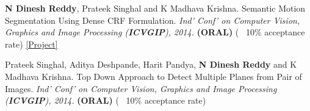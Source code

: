 \documentclass[7pt]{article}
\begin{document}
\begin{small}
\textbf{N Dinesh Reddy}, Prateek Singhal and K Madhava Krishna. Semantic Motion Segmentation Using Dense CRF Formulation. {\sl Ind' Conf' on Computer Vision, Graphics and Image Processing (\textbf{ICVGIP}), 2014.} \textbf{(ORAL)} (~ 10\% acceptance rate) \href{https://researchweb.iiit.ac.in/~dineshreddy.n/zerotype/projects/SMS/} {[Project]}
 

 Prateek Singhal, Aditya Deshpande, Harit Pandya, \textbf{N Dinesh Reddy} and K Madhava Krishna. Top Down Approach to Detect Multiple Planes from Pair of Images. {\sl Ind' Conf' on Computer Vision, Graphics and Image Processing (\textbf{ICVGIP}), 2014.} \textbf{(ORAL)}  (~ 10\% acceptance rate)
 
 
 
 


 
 

\end{small}
\end{document}
